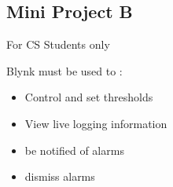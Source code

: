\subsection{Mini Project B}
For CS Students only

Blynk must be used to :
\begin{itemize}
    \item Control and set thresholds
    \item View live logging information
    \item be notified of alarms
    \item dismiss alarms
\end{itemize}